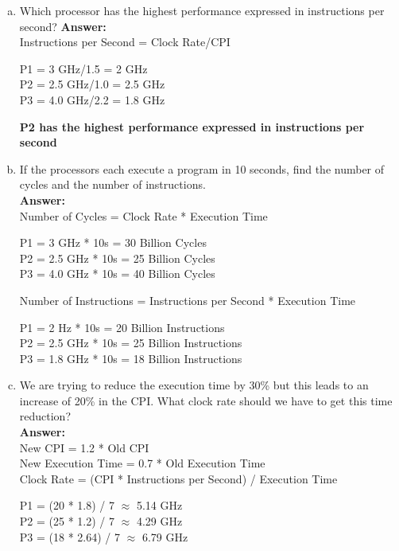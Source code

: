 \documentclass[12pt]{article}
\begin{document}
\begin{enumerate}[(a)]
    \item Which processor has the highest performance expressed in instructions per second?
    \textbf{Answer:}
    \\
    Instructions per Second = Clock Rate/CPI
        \begin{center}
            P1 = 3 GHz/1.5 = 2 GHz\\
            P2 = 2.5 GHz/1.0 = 2.5 GHz\\
            P3 = 4.0 GHz/2.2 = 1.8 GHz\\
        \end{center}
    \textbf{P2 has the highest performance expressed in instructions per second}
    
    \item If the processors each execute a program in 10 seconds, find the number of cycles and the number of instructions.
    \\
    \textbf{Answer:}
    \\
    Number of Cycles = Clock Rate * Execution Time
        \begin{center}
            P1 = 3 GHz * 10s = 30 Billion Cycles\\
            P2 = 2.5 GHz * 10s = 25 Billion Cycles\\
            P3 = 4.0 GHz * 10s = 40 Billion Cycles\\
        \end{center}
    
    Number of Instructions = Instructions per Second * Execution Time
        \begin{center}
            P1 = 2 Hz * 10s = 20 Billion Instructions\\
            P2 = 2.5 GHz * 10s = 25 Billion Instructions\\
            P3 = 1.8 GHz * 10s = 18 Billion Instructions\\
        \end{center}

    \item We are trying to reduce the execution time by 30\% but this leads to an increase of 20\% in the CPI. What clock rate should we have to get this time reduction?
    \\
    \textbf{Answer:}
    \\
    New CPI = 1.2 * Old CPI\\
    New Execution Time = 0.7 * Old Execution Time\\
    Clock Rate = (CPI * Instructions per Second) / Execution Time
        \begin{center}
            P1 = (20 * 1.8) / 7 $\approx$ 5.14 GHz\\
            P2 = (25 * 1.2) / 7 $\approx$ 4.29 GHz\\
            P3 = (18 * 2.64) / 7 $\approx$ 6.79 GHz\\
        \end{center}

\end{enumerate}
\end{document}
